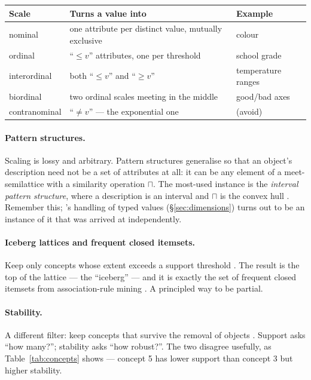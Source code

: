 \begin{center}\small
\begin{tabularx}{\textwidth}{@{}lXl@{}}
\toprule
\textbf{Scale} & \textbf{Turns a value into} & \textbf{Example}\\
\midrule
nominal      & one attribute per distinct value, mutually exclusive & colour\\
ordinal      & ``$\leq v$'' attributes, one per threshold & school grade\\
interordinal & both ``$\leq v$'' and ``$\geq v$'' & temperature ranges\\
biordinal    & two ordinal scales meeting in the middle & good/bad axes\\
contranominal& ``$\neq v$'' --- the exponential one & (avoid)\\
\bottomrule
\end{tabularx}
\end{center}

\paragraph{Pattern structures.} Scaling is lossy and arbitrary. Pattern
structures \citep{ganter2001} generalise \fca{} so that an object's
description need not be a set of attributes at all: it can be any element of a
meet-semilattice with a similarity operation $\sqcap$. The most-used instance
is the \emph{interval pattern structure}, where a description is an interval
and $\sqcap$ is the convex hull \citep{kaytoue2011}. Remember this; \odag{}'s
handling of typed values (\S\ref{sec:dimensions}) turns out to be an instance
of it that was arrived at independently.

\paragraph{Iceberg lattices and frequent closed itemsets.} Keep only concepts
whose extent exceeds a support threshold \citep{stumme2002}. The result is the
top of the lattice --- the ``iceberg'' --- and it is exactly the set of
frequent closed itemsets from association-rule mining \citep{pasquier1999}. A
principled way to be partial.

\paragraph{Stability.} A different filter: keep concepts that survive the
removal of objects \citep{kuznetsov2007}. Support asks ``how many?''; stability
asks ``how robust?''. The two disagree usefully, as
Table~\ref{tab:concepts} shows --- concept 5 has lower support than concept 3
but higher stability.

